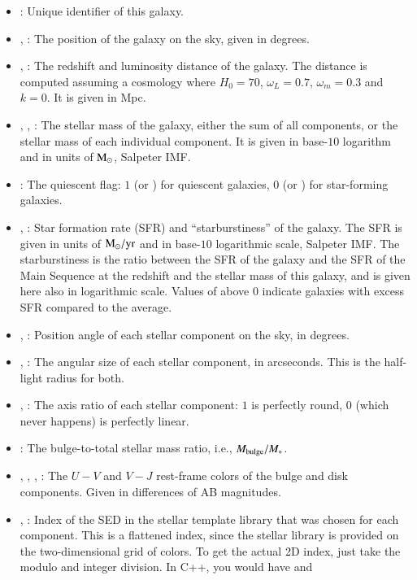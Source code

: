 \begin{itemize}
\item {}: Unique identifier of this galaxy.
\item {}, : The position of the galaxy on the sky, given in degrees.
\item {}, : The redshift and luminosity distance of the galaxy. The distance is computed assuming a cosmology where $H_0=70$, $\omega_L=0.7$, $\omega_m = 0.3$ and $k=0$. It is given in Mpc.
\item {}, , : The stellar mass of the galaxy, either the sum of all components, or the stellar mass of each individual component. It is given in base-$10$ logarithm and in units of ${\rm M}_\odot$, Salpeter IMF.
\item {}: The quiescent flag: $1$ (or ) for quiescent galaxies, $0$ (or ) for star-forming galaxies.
\item {}, : Star formation rate (SFR) and ``starburstiness'' of the galaxy. The SFR is given in units of ${\rm M}_\odot/{\rm yr}$ and in base-$10$ logarithmic scale, Salpeter IMF. The starburstiness is the ratio between the SFR of the galaxy and the SFR of the Main Sequence at the redshift and the stellar mass of this galaxy, and is given here also in logarithmic scale. Values of  above $0$ indicate galaxies with excess SFR compared to the average.
\item {}, : Position angle of each stellar component on the sky, in degrees.
\item {}, : The angular size of each stellar component, in arcseconds. This is the half-light radius for both.
\item {}, : The axis ratio of each stellar component: $1$ is perfectly round, $0$ (which never happens) is perfectly linear.
\item {}: The bulge-to-total stellar mass ratio, i.e., $M_{\rm bulge}/M_*$.
\item {}, , , : The $U-V$ and $V-J$ rest-frame colors of the bulge and disk components. Given in differences of AB magnitudes.
\item {}, : Index of the SED in the stellar template library that was chosen for each component. This is a flattened index, since the stellar library is provided on the two-dimensional grid of colors. To get the actual 2D index, just take the modulo and integer division. In C++, you would have  and \cppinline{ivj = opt_sed%
}
\end{itemize}
